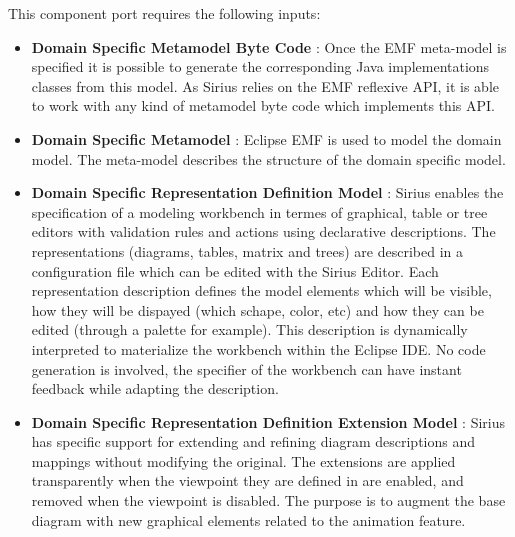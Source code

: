 \documentclass{gemoc} %
\begin{document}
This component port requires the following inputs:
\begin{itemize}
  \item \textbf{Domain Specific Metamodel Byte Code} :
Once the EMF meta-model is specified it is possible to generate the corresponding Java implementations classes from this model. As Sirius relies on the EMF reflexive API, it is able to work with any kind of metamodel byte code which implements this API.
  \item \textbf{Domain Specific Metamodel} :
Eclipse EMF is used to model the domain model. The meta-model describes the structure of the domain specific model.
  \item \textbf{Domain Specific  Representation Definition Model} :
Sirius enables the specification of a modeling workbench in termes of graphical, table or tree editors with validation rules and actions using declarative descriptions. The representations (diagrams, tables, matrix and trees) are described in a configuration file which can be edited with the Sirius Editor. Each representation description defines the model elements which will be visible, how they will be dispayed (which schape, color, etc) and how they can be edited (through a palette for example). This description is dynamically interpreted to materialize the workbench within the Eclipse IDE. No code generation is involved, the specifier of the workbench can have instant feedback while adapting the description.  
  \item \textbf{Domain Specific Representation Definition Extension Model} :
Sirius has specific support for extending and refining diagram descriptions and mappings without modifying the original. The extensions are applied transparently when the viewpoint they are defined in are enabled, and removed when the viewpoint is disabled.  The purpose is to augment the base diagram with new graphical elements related to the animation feature.
\end{itemize}
\end{document}
